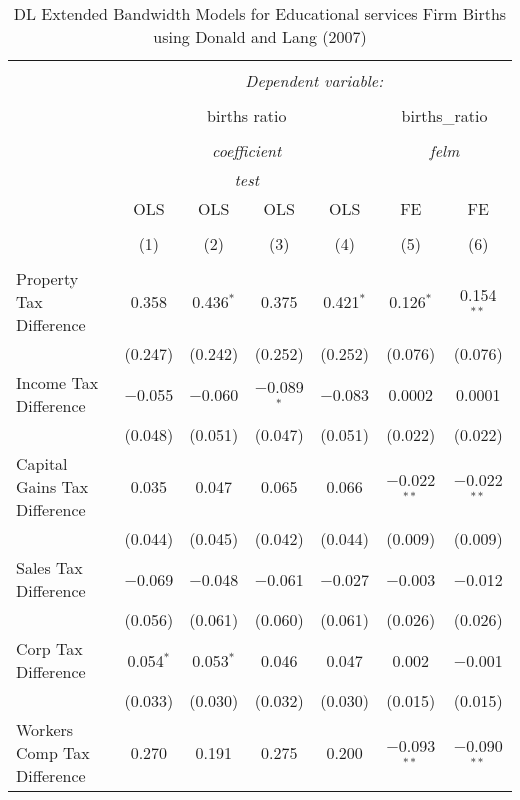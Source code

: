 
\begin{table}[!htbp] \centering 
  \caption{DL Extended Bandwidth Models for  Educational services Firm Births using Donald and Lang (2007)} 
  \label{} 
\begin{tabular}{@{\extracolsep{5pt}}lcccccc} 
\\[-1.8ex]\hline 
\hline \\[-1.8ex] 
 & \multicolumn{6}{c}{\textit{Dependent variable:}} \\ 
\cline{2-7} 
\\[-1.8ex] & \multicolumn{4}{c}{births ratio} & \multicolumn{2}{c}{births\_ratio} \\ 
\\[-1.8ex] & \multicolumn{4}{c}{\textit{coefficient}} & \multicolumn{2}{c}{\textit{felm}} \\ 
 & \multicolumn{4}{c}{\textit{test}} & \multicolumn{2}{c}{\textit{}} \\ 
 & OLS & OLS & OLS & OLS & FE & FE \\ 
\\[-1.8ex] & (1) & (2) & (3) & (4) & (5) & (6)\\ 
\hline \\[-1.8ex] 
 Property Tax Difference & 0.358 & 0.436$^{*}$ & 0.375 & 0.421$^{*}$ & 0.126$^{*}$ & 0.154$^{**}$ \\ 
  & (0.247) & (0.242) & (0.252) & (0.252) & (0.076) & (0.076) \\ 
  Income Tax Difference & $-$0.055 & $-$0.060 & $-$0.089$^{*}$ & $-$0.083 & 0.0002 & 0.0001 \\ 
  & (0.048) & (0.051) & (0.047) & (0.051) & (0.022) & (0.022) \\ 
  Capital Gains Tax Difference & 0.035 & 0.047 & 0.065 & 0.066 & $-$0.022$^{**}$ & $-$0.022$^{**}$ \\ 
  & (0.044) & (0.045) & (0.042) & (0.044) & (0.009) & (0.009) \\ 
  Sales Tax Difference & $-$0.069 & $-$0.048 & $-$0.061 & $-$0.027 & $-$0.003 & $-$0.012 \\ 
  & (0.056) & (0.061) & (0.060) & (0.061) & (0.026) & (0.026) \\ 
  Corp Tax Difference & 0.054$^{*}$ & 0.053$^{*}$ & 0.046 & 0.047 & 0.002 & $-$0.001 \\ 
  & (0.033) & (0.030) & (0.032) & (0.030) & (0.015) & (0.015) \\ 
  Workers Comp Tax Difference & 0.270 & 0.191 & 0.275 & 0.200 & $-$0.093$^{**}$ & $-$0.090$^{**}$ \\ 

\end{tabular}
\end{table}
